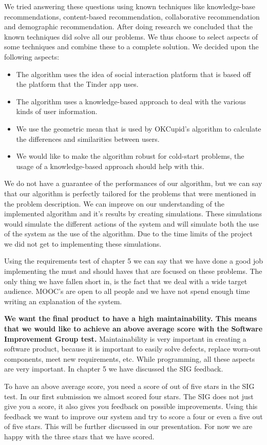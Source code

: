 We tried answering these questions using known techniques like knowledge-base recommendations, content-based recommendation, collaborative recommendation and demographic recommendation.
After doing research we concluded that the known techniques did solve all our problems.
We thus choose to select aspects of some techniques and combine these to a complete solution.
We decided upon the following aspects:
\begin{itemize}
\item The algorithm uses the idea of social interaction platform that is based off the platform that the Tinder app uses.
\item The algorithm uses a knowledge-based approach to deal with the various kinds of user information.
\item We use the geometric mean that is used by OKCupid's algorithm to calculate the differences and similarities between users.
\item We would like to make the algorithm robust for cold-start problems, the usage of a knowledge-based approach should help with this.
\end{itemize}

We do not have a guarantee of the performances of our algorithm, but we can say that our algorithm is perfectly tailored for the problems that were mentioned in the problem description.
We can improve on our understanding of the implemented algorithm and it's results by creating simulations.
These simulations would simulate the different actions of the system and will simulate both the use of the system as the use of the algorithm.
Due to the time limits of the project we did not get to implementing these simulations.

Using the requirements test of chapter 5 we can say that we have done a good job implementing the must and should haves that are focused on these problems.
The only thing we have fallen short in, is the fact that we deal with a wide target audience.
MOOC's are open to all people and we have not spend enough time writing an explanation of the system.

\textbf{We want the final product to have a high maintainability.
This means that we would like to achieve an above average score with the Software Improvement Group test.}
Maintainability is very important in creating a software product, because it is important to easily solve defects, replace worn-out components, meet new requirements, etc.
While programming, all these aspects are very important.
In chapter 5 we have discussed the SIG feedback.

To have an above average score, you need a score of out of five stars in the SIG test.
In our first submission we almost scored four stars.
The SIG does not just give you a score, it also gives you feedback on possible improvements.
Using this feedback we want to improve our system and try to score a four or even a five out of five stars.
This will be further discussed in our presentation.
For now we are happy with the three stars that we have scored.

